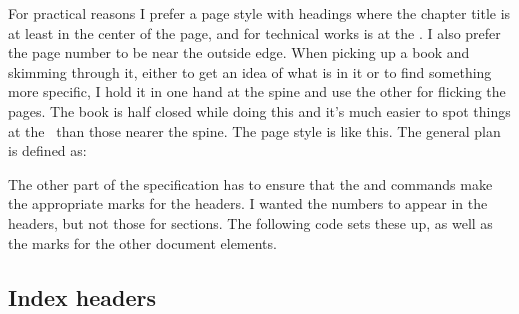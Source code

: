     For practical reasons I prefer a page style with headings
where the chapter title is at least in the center 
of the page, and for technical works is at the \foredge. I also prefer the
page number to be near the outside edge. When picking up a book and skimming
through it, either to get an idea of what is in it or to find something more
specific, I hold it in one hand at the spine and use the other for flicking
the pages. The book is half closed while doing this and it's much easier
to spot things at the \foredge\ than those nearer the spine. 
The  page style is like this. The general plan is defined as:
\begin{lcode}
\end{lcode}
The other part of the specification has to ensure that the \cmd{\chapter}
and \cmd{\section} commands make the appropriate marks for the headers.
I wanted the numbers to appear in the headers, but not those for sections. The following
code sets these up, as well as the marks for the other document elements.
\begin{lcode}
\end{lcode}




\subsection{Index headers}


